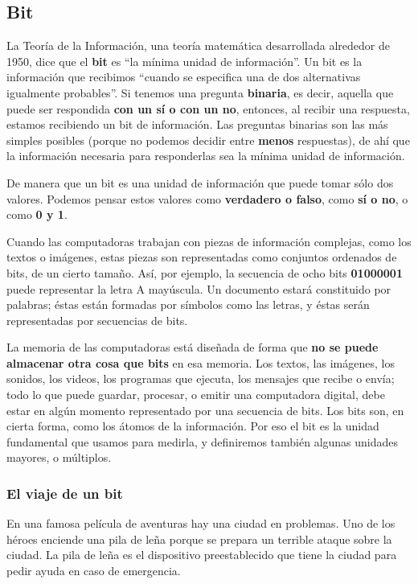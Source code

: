 \documentclass[spanish,A4,]{article}
\begin{document}
\subsection{Bit}\label{bit}

La Teoría de la Información, una teoría matemática desarrollada
alrededor de 1950, dice que el \textbf{bit} es ``la mínima unidad de
información''. Un bit es la información que recibimos ``cuando se
especifica una de dos alternativas igualmente probables''. Si tenemos
una pregunta \textbf{binaria}, es decir, aquella que puede ser
respondida \textbf{con un sí o con un no}, entonces, al recibir una
respuesta, estamos recibiendo un bit de información. Las preguntas
binarias son las más simples posibles (porque no podemos decidir entre
\textbf{menos} respuestas), de ahí que la información necesaria para
responderlas sea la mínima unidad de información.

De manera que un bit es una unidad de información que puede tomar sólo
dos valores. Podemos pensar estos valores como \textbf{verdadero o
falso}, como \textbf{sí o no}, o como \textbf{0 y 1}.

Cuando las computadoras trabajan con piezas de información complejas,
como los textos o imágenes, estas piezas son representadas como
conjuntos ordenados de bits, de un cierto tamaño. Así, por ejemplo, la
secuencia de ocho bits \textbf{01000001} puede representar la letra A
mayúscula. Un documento estará constituido por palabras; éstas están
formadas por símbolos como las letras, y éstas serán representadas por
secuencias de bits.

La memoria de las computadoras está diseñada de forma que \textbf{no se
puede almacenar otra cosa que bits} en esa memoria. Los textos, las
imágenes, los sonidos, los videos, los programas que ejecuta, los
mensajes que recibe o envía; todo lo que puede guardar, procesar, o
emitir una computadora digital, debe estar en algún momento representado
por una secuencia de bits. Los bits son, en cierta forma, como los
átomos de la información. Por eso el bit es la unidad fundamental que
usamos para medirla, y definiremos también algunas unidades mayores, o
múltiplos.

\subsubsection{El viaje de un bit}\label{el-viaje-de-un-bit}

En una famosa película de aventuras hay una ciudad en problemas. Uno de
los héroes enciende una pila de leña porque se prepara un terrible
ataque sobre la ciudad. La pila de leña es el dispositivo preestablecido
que tiene la ciudad para pedir ayuda en caso de emergencia.
\end{document}
